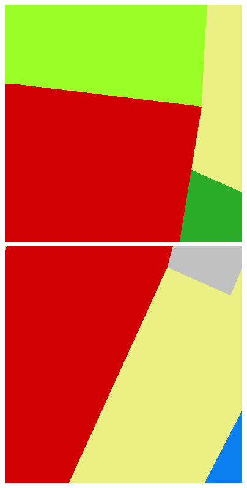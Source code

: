 \begin{figure}
    \vspace{3mm}

    \includegraphics[width=\LabelConsiderationImageWidth]{images/consideration_labels/44883-label}
    \hspace{1mm}
    \includegraphics[width=\LabelConsiderationImageWidth]{images/consideration_labels/150815-label}
    \hspace{1mm}

\end{figure}
